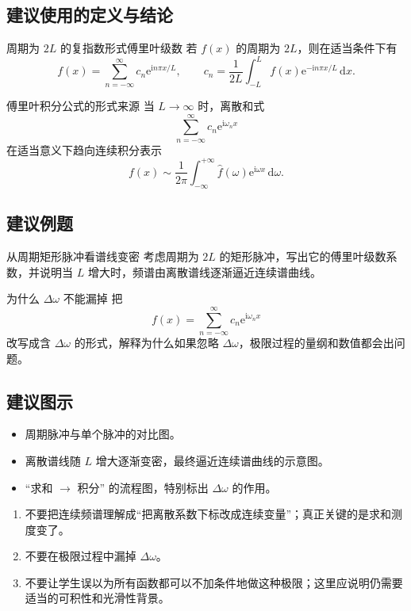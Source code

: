 \subsection*{建议使用的定义与结论}
\begin{dingli}{周期为 $2L$ 的复指数形式傅里叶级数}{}
若 $f(x)$ 的周期为 $2L$，则在适当条件下有
\[
    f(x)=\sum_{n=-\infty}^{\infty} c_n \mathrm{e}^{\mathrm{i}n\pi x/L},
    \qquad
    c_n=\frac{1}{2L}\int_{-L}^{L} f(x)\mathrm{e}^{-\mathrm{i}n\pi x/L}\,\mathrm{d}x.
\]
\end{dingli}

\begin{dingli}{傅里叶积分公式的形式来源}{}
当 $L\to\infty$ 时，离散和式
\[
    \sum_{n=-\infty}^{\infty} c_n \mathrm{e}^{\mathrm{i}\omega_n x}
\]
在适当意义下趋向连续积分表示
\[
    f(x)\sim \frac{1}{2\pi}\int_{-\infty}^{+\infty} \hat{f}(\omega)\mathrm{e}^{\mathrm{i}\omega x}\,\mathrm{d}\omega.
\]
\end{dingli}

\subsection*{建议例题}
\begin{lizi}{从周期矩形脉冲看谱线变密}{}
考虑周期为 $2L$ 的矩形脉冲，写出它的傅里叶级数系数，并说明当 $L$ 增大时，频谱由离散谱线逐渐逼近连续谱曲线。
\end{lizi}

\begin{lizi}{为什么 $\Delta\omega$ 不能漏掉}{}
把
\[
    f(x)=\sum_{n=-\infty}^{\infty} c_n \mathrm{e}^{\mathrm{i}\omega_n x}
\]
改写成含 $\Delta\omega$ 的形式，解释为什么如果忽略 $\Delta\omega$，极限过程的量纲和数值都会出问题。
\end{lizi}

\subsection*{建议图示}
\begin{itemize}
    \item 周期脉冲与单个脉冲的对比图。
    \item 离散谱线随 $L$ 增大逐渐变密，最终逼近连续谱曲线的示意图。
    \item ``求和 $\to$ 积分'' 的流程图，特别标出 $\Delta\omega$ 的作用。
\end{itemize}

\begin{jinshi}[本节易错点]
\begin{enumerate}
    \item 不要把连续频谱理解成``把离散系数下标改成连续变量''；真正关键的是求和测度变了。
    \item 不要在极限过程中漏掉 $\Delta\omega$。
    \item 不要让学生误以为所有函数都可以不加条件地做这种极限；这里应说明仍需要适当的可积性和光滑性背景。
\end{enumerate}
\end{jinshi}


